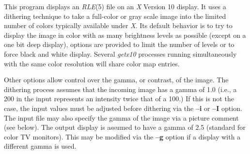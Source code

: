 This program displays an
{\it RLE}{\rm (5)}
file on an 
{\it X} Version 10
display.  It uses a dithering technique to take a
full-color or gray scale image into the limited number of colors
typically available under
{\it X}{\rm .}
Its default behavior is to try to
display the image in color with as many brightness levels as possible
(except on a one bit deep display), options are provided to limit the
number of levels or to force black and white display.  Several
{\it getx10}
processes running simultaneously with the same color resolution will
share color map entries.

Other options allow control over the gamma, or contrast, of the image.
The dithering process assumes that the incoming image has a gamma of
1.0 (i.e., a 200 in the input represents an intensity twice that of
a 100.)  If this is not the case, the input values must be adjusted
before dithering via the
{\bf --i}
or 
{\bf --I}
option.  The input file may also specify the gamma of the image via a
picture comment (see below).  The output display is assumed to have a gamma of
2.5 (standard for color TV monitors).  This may be modified via the
{\bf --g}
option if a display with a different gamma is used.

